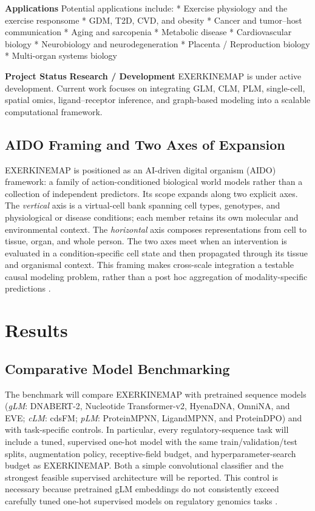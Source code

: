 \documentclass[11pt]{article}
\begin{document}
\textbf{Applications} \newline
Potential applications include:
* Exercise physiology and the exercise responsome
* GDM, T2D, CVD, and obesity
* Cancer and tumor–host communication
* Aging and sarcopenia
* Metabolic disease
* Cardiovascular biology
* Neurobiology and neurodegeneration
* Placenta / Reproduction biology
* Multi-organ systems biology

\textbf{Project Status}
\textbf{Research / Development} \newline
EXERKINEMAP is under active development. Current work focuses on integrating GLM, CLM, PLM, single-cell, spatial omics, ligand–receptor inference, and graph-based modeling into a scalable computational framework.

\subsection{AIDO Framing and Two Axes of Expansion}
EXERKINEMAP is positioned as an AI-driven digital organism (AIDO) framework: a family of action-conditioned biological world models rather than a collection of independent predictors. Its scope expands along two explicit axes. The \textit{vertical} axis is a virtual-cell bank spanning cell types, genotypes, and physiological or disease conditions; each member retains its own molecular and environmental context. The \textit{horizontal} axis composes representations from cell to tissue, organ, and whole person. The two axes meet when an intervention is evaluated in a condition-specific cell state and then propagated through its tissue and organismal context. This framing makes cross-scale integration a testable causal modeling problem, rather than a post hoc aggregation of modality-specific predictions \cite{xing2026}.

\section{Results}

\subsection{Comparative Model Benchmarking}
The benchmark will compare EXERKINEMAP with pretrained sequence models (\textit{gLM}: DNABERT-2, Nucleotide Transformer-v2, HyenaDNA, OmniNA, and EVE; \textit{cLM}: cdsFM; \textit{pLM}: ProteinMPNN, LigandMPNN, and ProteinDPO) and with task-specific controls. In particular, every regulatory-sequence task will include a tuned, supervised one-hot model with the same train/validation/test splits, augmentation policy, receptive-field budget, and hyperparameter-search budget as EXERKINEMAP. Both a simple convolutional classifier and the strongest feasible supervised architecture will be reported. This control is necessary because pretrained gLM embeddings do not consistently exceed carefully tuned one-hot supervised models on regulatory genomics tasks \cite{tang2025}.
\end{document}
